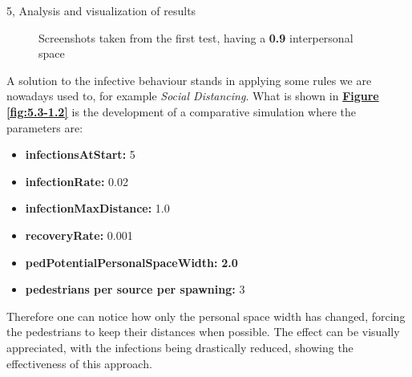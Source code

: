 \documentclass[10pt,a4paper]{article}
\begin{document}
\begin{task}{5, Analysis and visualization of results}
\begin{figure}[H]
    \centering
    \hfill
    \hfill
    \caption{Screenshots taken from the first test, having a \textbf{0.9} interpersonal space}
    \label{fig:5.3-1.1}
\end{figure}

A solution to the infective behaviour stands in applying some rules we are nowadays used to, for example \textit{Social Distancing}. What is shown in  \textbf{\hyperref[fig:5.3-1.2]{Figure \ref{fig:5.3-1.2}}} is the development of a comparative simulation where the parameters are:
\begin{itemize}
    \item \textbf{infectionsAtStart:} 5
    \item \textbf{infectionRate:} 0.02
    \item \textbf{infectionMaxDistance:} 1.0
    \item \textbf{recoveryRate:} 0.001
    \item \textbf{pedPotentialPersonalSpaceWidth:} \textbf{2.0}
    \item \textbf{pedestrians per source per spawning:} 3
\end{itemize}
Therefore one can notice how only the personal space width has changed, forcing the pedestrians to keep their distances when possible. The effect can be visually appreciated, with the infections being drastically reduced, showing the effectiveness of this approach.


\end{task}
\end{document}
